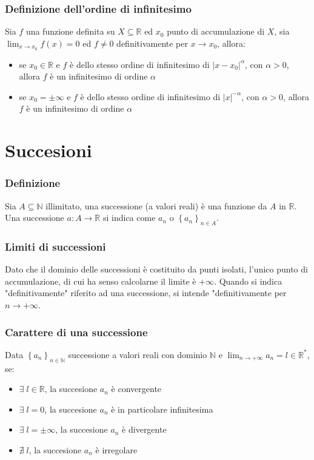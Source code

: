 \documentclass[a4paper]{article}
\begin{document}
\subsubsection*{Definizione dell'ordine di infinitesimo}
Sia \(f\) una funzione definita su \(X \subseteq \mathbb{R}\) ed \(x_0\) punto di accumulazione di \(X\), sia \(\displaystyle \lim_{x \to x_0} f(x) = 0\)
ed \(f \neq 0\) definitivamente per \(x \to x_0\), allora:
\begin{itemize}
	\item se \(x_0 \in \mathbb{R}\) e \(f\) è dello stesso ordine di infinitesimo di \(\left| x - x_0 \right| ^ \alpha\), con \(\alpha > 0\),
	allora \(f\) è un infinitesimo di ordine \(\alpha\)
	\item se \(x_0 = \pm \infty\) e \(f\) è dello stesso ordine di infinitesimo di \(\left| x \right| ^ {-\alpha}\), con \(\alpha > 0\),
	allora \(f\) è un infinitesimo di ordine \(\alpha\)
\end{itemize}

\newpage


\section{Succesioni}
\subsubsection*{Definizione}
Sia \(A \subseteq \mathbb{N}\) illimitato, una successione (a valori reali) è una funzione da \(A\) in \(\mathbb{R}\). \\
Una successione \(a : A \to \mathbb{R}\) si indica come \(a_n\) o \(\left\{ a_n \right\}_{n \in A}\).

\subsubsection*{Limiti di successioni}
Dato che il dominio delle successioni è costituito da punti isolati, l'unico punto di accumulazione, di cui ha senso 
calcolarne il limite è \(+\infty\). Quando si indica "definitivamente" riferito ad una successione, si intende "definitivamente
per \(n \to +\infty\).

\subsubsection*{Carattere di una successione}
Data \(\left\{ a_n \right\}_{n \in \mathbb{N}}\) successione a valori reali con dominio \(\mathbb{N}\) e \(\displaystyle \lim_{n \to +\infty} a_n = l \in \mathbb{R}^*\), se:
\begin{itemize}
	\item \(\exists \; l \in \mathbb{R}\), la succesione \(a_n\) è convergente
	\item \(\exists \; l = 0\), la succesione \(a_n\) è in particolare infinitesima
	\item \(\exists \; l = \pm \infty\), la succesione \(a_n\) è divergente
	\item \(\nexists \; l\), la succesione \(a_n\) è irregolare
\end{itemize}
\end{document}
